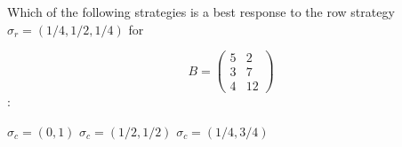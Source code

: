 \documentclass{exam}
\begin{document}
\begin{questions}
\question Which of the following strategies is a best response to the row strategy
    \(\sigma_r=(1/4, 1/2, 1/4)\) for 

    \[B=\begin{pmatrix}5 & 2\\ 3& 7\\ 4 &
    12\end{pmatrix}\]:
    \begin{checkboxes}
        \choice
    \(
        \sigma_c = (0, 1)
    \)
        \choice
    \(
        \sigma_c = (1/2, 1/2)
    \)
        \choice
    \(
        \sigma_c = (1/4, 3/4)
    \)
\end{checkboxes}

\end{questions}
\end{document}

